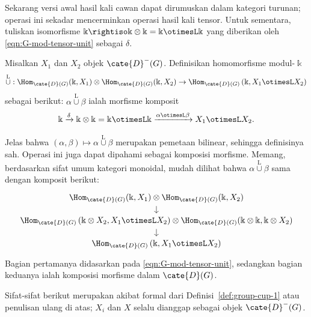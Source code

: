 Sekarang versi awal hasil kali cawan dapat dirumuskan dalam kategori turunan;
operasi ini sekadar mencerminkan operasi hasil kali tensor. Untuk sementara,
tuliskan isomorfisme
$\Bbbk\rightiso\Bbbk\otimes\Bbbk=\Bbbk\otimesL\Bbbk$ yang diberikan oleh
\eqref{eqn:G-mod-tensor-unit} sebagai $\delta$.

\begin{definisi}\label{def:group-cup-1}
	Misalkan $X_1$ dan $X_2$ objek $\cate{D}^-(G)$. Definisikan homomorfisme
	modul-$\Bbbk$
	\[ \overset{\mathrm{L}}{\cup}: \Hom_{\cate{D}(G)}(\Bbbk, X_1) \otimes \Hom_{\cate{D}(G)}(\Bbbk, X_2) \to \Hom_{\cate{D}(G)}\left(\Bbbk, X_1 \otimesL X_2\right) \]
	sebagai berikut: $\alpha\overset{\mathrm{L}}{\cup}\beta$ ialah morfisme
	komposit
	\[ \Bbbk \xrightarrow{\delta} \Bbbk \otimes \Bbbk = \Bbbk \otimesL \Bbbk \xrightarrow{\alpha \otimesL \beta} X_1 \otimesL X_2. \]
\end{definisi}

Jelas bahwa
$(\alpha,\beta)\mapsto\alpha\overset{\mathrm{L}}{\cup}\beta$ merupakan
pemetaan bilinear, sehingga definisinya sah. Operasi ini juga dapat dipahami
sebagai komposisi morfisme. Memang, berdasarkan sifat umum kategori monoidal,
mudah dilihat bahwa $\alpha\overset{\mathrm{L}}{\cup}\beta$ sama dengan
komposit berikut:
\[\begin{tikzcd}[row sep=small]
	\Hom_{\cate{D}(G)}(\Bbbk, X_1) \otimes \Hom_{\cate{D}(G)}(\Bbbk, X_2) \arrow[d] \\
	\Hom_{\cate{D}(G)}\left( \Bbbk \otimes X_2, X_1 \otimesL X_2\right) \otimes \Hom_{\cate{D}(G)}(\Bbbk \otimes \Bbbk, \Bbbk \otimes X_2) \arrow[d] \\
	\Hom_{\cate{D}(G)}\left(\Bbbk, X_1 \otimesL X_2 \right)
\end{tikzcd}\]
Bagian pertamanya didasarkan pada \eqref{eqn:G-mod-tensor-unit}, sedangkan
bagian keduanya ialah komposisi morfisme dalam $\cate{D}(G)$.

Sifat-sifat berikut merupakan akibat formal dari
Definisi~\ref{def:group-cup-1} atau penulisan ulang di atas; $X_i$ dan $X$
selalu dianggap sebagai objek $\cate{D}^-(G)$.

